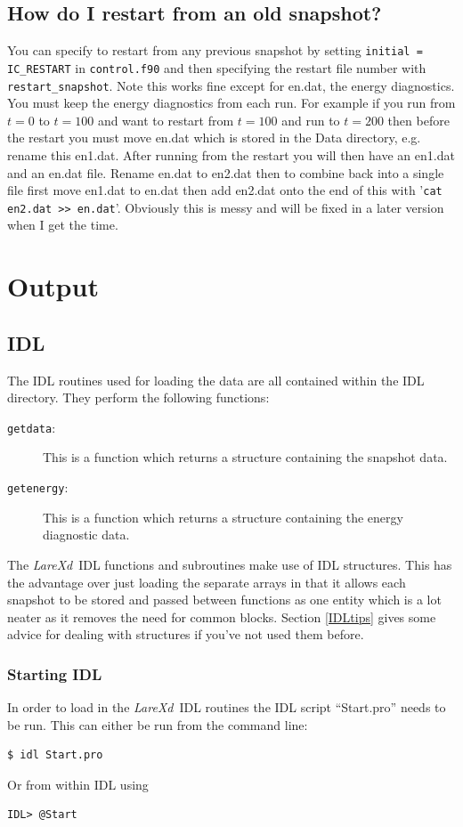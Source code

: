 \documentclass[11pt]{article}
\newcommand{\lare}{{\it LareXd}\ }
\begin{document}
\subsection*{How do I restart from an old snapshot?}
You can specify to restart from any previous snapshot by setting \texttt{initial = IC\_RESTART} in
\texttt{control.f90} and then specifying the restart file number with \texttt{restart\_snapshot}. Note this works fine except for en.dat, the energy diagnostics. You must keep the energy diagnostics from each run. For example if you run from $t=0$ to $t=100$ and want to restart from $t=100$ and run to $t=200$ then before the restart you must move en.dat which is stored in the Data directory, e.g. rename this en1.dat. After running from the restart you will then have an en1.dat and an en.dat file. Rename en.dat to en2.dat then to combine back into a single file first move en1.dat to en.dat then add en2.dat onto the end of this with '\texttt{cat en2.dat >> en.dat}'. Obviously this is messy and will be fixed in a later version when I get the time.            


\section{Output}
\subsection{IDL}
The IDL routines used for loading the data are all contained within the IDL directory. They perform the following functions:
\begin{description}
\item[\texttt{getdata}:] This is a function which returns a structure containing the snapshot data.
\item[\texttt{getenergy}:]  This is a function which returns a structure containing the energy diagnostic data.
\end{description}

The \lare IDL functions and subroutines make use of IDL structures. This has the advantage over just loading the separate arrays in that it allows each snapshot to be stored and passed between functions as one entity which is a lot neater as it removes the need for common blocks. Section \ref{IDLtips} gives some advice for dealing with structures if you've not used them before.

\subsubsection{Starting IDL}
In order to load in the \lare IDL routines the IDL script ``Start.pro'' needs to be run. This can either be run from the command line:
\begin{verbatim}
$ idl Start.pro
\end{verbatim}
Or from within IDL using
\begin{verbatim}
IDL> @Start
\end{verbatim}
\end{document}

